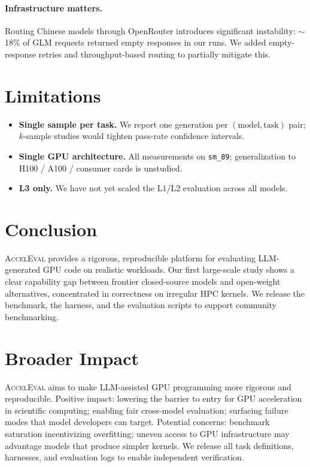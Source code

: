 \documentclass{article}
\begin{document}
\paragraph{Infrastructure matters.} Routing Chinese models through OpenRouter introduces significant instability: $\sim$18\% of GLM requests returned empty responses in our runs. We added empty-response retries and throughput-based routing to partially mitigate this.

\section{Limitations}
\label{sec:limitations}

\begin{itemize}
  \item \textbf{Single sample per task.} We report one generation per $(\text{model},\text{task})$ pair; $k$-sample studies would tighten pass-rate confidence intervals.
  \item \textbf{Single GPU architecture.} All measurements on \texttt{sm\_89}; generalization to H100 / A100 / consumer cards is unstudied.
  \item \textbf{L3 only.} We have not yet scaled the L1/L2 evaluation across all models.
\end{itemize}

\section{Conclusion}
\label{sec:conclusion}

\textsc{AccelEval} provides a rigorous, reproducible platform for evaluating LLM-generated GPU code on realistic workloads. Our first large-scale study shows a clear capability gap between frontier closed-source models and open-weight alternatives, concentrated in correctness on irregular HPC kernels. We release the benchmark, the harness, and the evaluation scripts to support community benchmarking.

\section*{Broader Impact}

\textsc{AccelEval} aims to make LLM-assisted GPU programming more rigorous and reproducible. Positive impact: lowering the barrier to entry for GPU acceleration in scientific computing; enabling fair cross-model evaluation; surfacing failure modes that model developers can target. Potential concerns: benchmark saturation incentivizing overfitting; uneven access to GPU infrastructure may advantage models that produce simpler kernels. We release all task definitions, harnesses, and evaluation logs to enable independent verification.
\end{document}
